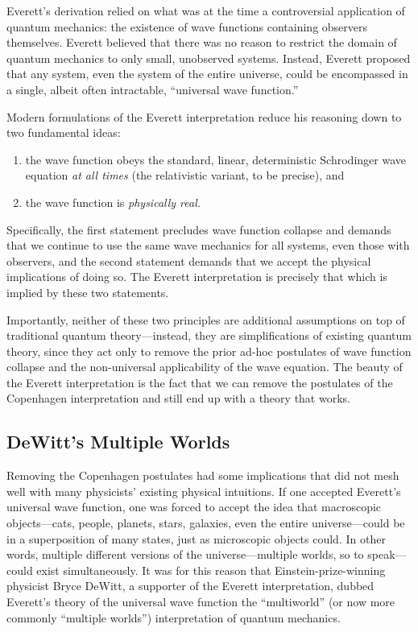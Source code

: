 \documentclass[
    12pt,
    letterpaper,
    aps,
    prd,
    longbibliography,
    twocolumn,
    nofootinbib,
    raggedbottom,
    amsmath,
    amssymb,
    amsfonts,
]{revtex4-1}
\begin{document}
Everett's derivation relied on what was at the time a controversial application of quantum mechanics: the existence of wave functions containing observers themselves. Everett believed that there was no reason to restrict the domain of quantum mechanics to only small, unobserved systems. Instead, Everett proposed that any system, even the system of the entire universe, could be encompassed in a single, albeit often intractable, ``universal wave function.''

Modern formulations of the Everett interpretation reduce his reasoning down to two fundamental ideas:\cite{dewitt}\cite{falsification}\cite{bornproof2}\cite{manyworldsbook}\cite{wallacebook}
\begin{enumerate}[1.]
\item the wave function obeys the standard, linear, deterministic Schrodinger wave equation \textit{at all times} (the relativistic variant, to be precise), and
\item the wave function is \textit{physically real.}
\end{enumerate}
Specifically, the first statement precludes wave function collapse and demands that we continue to use the same wave mechanics for all systems, even those with observers, and the second statement demands that we accept the physical implications of doing so. The Everett interpretation is precisely that which is implied by these two statements.

Importantly, neither of these two principles are additional assumptions on top of traditional quantum theory---instead, they are simplifications of existing quantum theory, since they act only to remove the prior ad-hoc postulates of wave function collapse and the non-universal applicability of the wave equation.\cite{bornproof2}\cite{bornproof2summary} The beauty of the Everett interpretation is the fact that we can remove the postulates of the Copenhagen interpretation and still end up with a theory that works.

\subsection{DeWitt's Multiple Worlds}

Removing the Copenhagen postulates had some implications that did not mesh well with many physicists' existing physical intuitions. If one accepted Everett's universal wave function, one was forced to accept the idea that macroscopic objects---cats, people, planets, stars, galaxies, even the entire universe---could be in a superposition of many states, just as microscopic objects could. In other words, multiple different versions of the universe---multiple worlds, so to speak---could exist simultaneously. It was for this reason that Einstein-prize-winning physicist Bryce DeWitt, a supporter of the Everett interpretation, dubbed Everett's theory of the universal wave function the ``multiworld'' (or now more commonly ``multiple worlds'') interpretation of quantum mechanics.\cite{dewitt}
\end{document}

